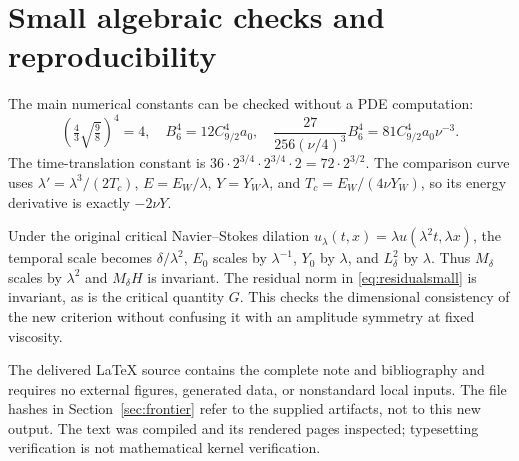 \documentclass[11pt,a4paper]{article}
\theoremstyle{definition}\newtheorem{definition}[theorem]{Definition}
\theoremstyle{remark}\newtheorem{remark}[theorem]{Remark}
\numberwithin{equation}{section}
\begin{document}
\section{Small algebraic checks and reproducibility}
\label{app:checks}
The main numerical constants can be checked without a PDE computation:
\[
 \left(\tfrac43\sqrt{\tfrac98}\right)^4=4,
 \quad B_6^4=12C_{9/2}^4a_0,
 \quad \frac{27}{256(\nu/4)^3}B_6^4
       =81C_{9/2}^4a_0\nu^{-3}.
\]
The time-translation constant is
$36\cdot2^{3/4}\cdot2^{3/4}\cdot2=72\cdot2^{3/2}$.
The comparison curve uses
$\lambda'=\lambda^3/(2T_c)$, $E=E_W/\lambda$,
$Y=Y_W\lambda$, and $T_c=E_W/(4\nu Y_W)$, so its energy derivative is exactly $-2\nu Y$.

Under the original critical Navier--Stokes dilation $u_\lambda(t,x)=\lambda u(\lambda^2t,\lambda x)$, the temporal scale becomes $\delta/\lambda^2$, $E_0$ scales by $\lambda^{-1}$, $Y_0$ by $\lambda$, and $L_\delta^2$ by $\lambda$. Thus $M_\delta$ scales by $\lambda^2$ and $M_\delta H$ is invariant. The residual norm in \eqref{eq:residualsmall} is invariant, as is the critical quantity $G$. This checks the dimensional consistency of the new criterion without confusing it with an amplitude symmetry at fixed viscosity.

The delivered LaTeX source contains the complete note and bibliography and requires no external figures, generated data, or nonstandard local inputs. The file hashes in Section~\ref{sec:frontier} refer to the supplied artifacts, not to this new output. The text was compiled and its rendered pages inspected; typesetting verification is not mathematical kernel verification.
\end{document}
